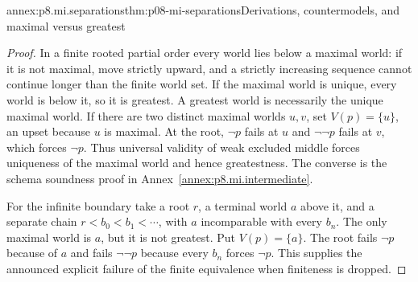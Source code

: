 \begin{annexitem}{annex:p8.mi.separations}{thm:p08-mi-separations}{Derivations, countermodels, and maximal versus greatest}
\begin{proof}
In a finite rooted partial order every world lies below a maximal world:
if it is not maximal, move strictly upward, and a strictly increasing
sequence cannot continue longer than the finite world set. If the
maximal world is unique, every world is below it, so it is greatest.
A greatest world is necessarily the unique maximal world. If there
are two distinct maximal worlds \(u,v\), set \(V(p)=\{u\}\),
an upset because \(u\) is maximal. At the root, \(\neg p\)
fails at \(u\) and \(\neg\neg p\) fails at \(v\), which forces
\(\neg p\). Thus universal validity of weak excluded middle forces
uniqueness of the maximal world and hence greatestness. The converse
is the schema soundness proof in Annex~\ref{annex:p8.mi.intermediate}.

For the infinite boundary take a root \(r\), a terminal world \(a\)
above it, and a separate chain \(r<b_0<b_1<\cdots\), with \(a\)
incomparable with every \(b_n\). The only maximal world is \(a\),
but it is not greatest. Put \(V(p)=\{a\}\). The root fails
\(\neg p\) because of \(a\) and fails \(\neg\neg p\)
because every \(b_n\) forces \(\neg p\). This supplies the
announced explicit failure of the finite equivalence when finiteness
is dropped.
\end{proof}
\end{annexitem}

